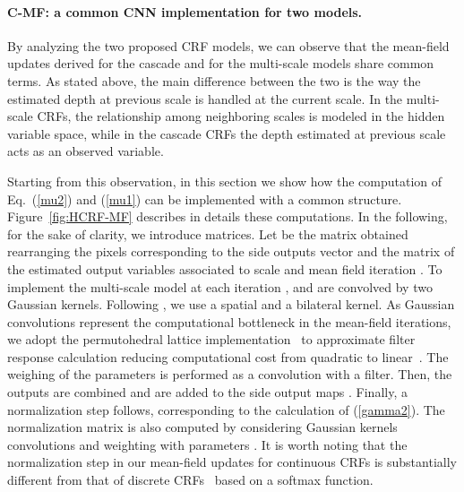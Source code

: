 \documentclass[10pt,twocolumn,letterpaper]{article}
\begin{document}
\paragraph{C-MF: a common {CNN} implementation for two models.} 
By analyzing the two proposed CRF models, we can observe that 
the mean-field updates derived for the cascade and for the multi-scale models
share common terms. As stated above, the main difference between the two is the way 
the estimated depth at previous scale is handled at the current scale. In the multi-scale CRFs, 
the relationship among neighboring scales is modeled in the hidden variable space, while in the cascade CRFs the depth estimated at previous scale acts as an observed variable.





Starting from this observation, in this section we show how the computation of Eq.~(\ref{mu2}) and (\ref{mu1}) can be implemented 
with a common structure. 
Figure~\ref{fig:HCRF-MF} describes in details these computations. In the following, for the sake of
clarity, we introduce matrices. Let  be the matrix obtained rearranging 
the  pixels corresponding to the side outputs vector  and  
the matrix of the estimated output variables associated to scale  and mean field iteration .
To implement the multi-scale model at each iteration ,  and  are convolved 
by two Gaussian kernels. Following \cite{koltun2011efficient}, we use a spatial and a bilateral kernel. As Gaussian convolutions 
represent the computational bottleneck in the mean-field iterations, 
we adopt the permutohedral lattice implementation~\cite{adams2010fast} to approximate
filter response calculation reducing computational cost from quadratic to linear~\cite{ristovski2013continuous}.
The weighing of the parameters  is performed as a convolution with a  filter.
Then, the outputs are combined and are added to the side output maps . 
Finally, a normalization step follows, corresponding to the calculation of (\ref{gamma2}). The normalization matrix 
 is also computed by considering Gaussian kernels convolutions and 
weighting with parameters . It is worth noting that the normalization step in our mean-field updates for 
continuous CRFs is substantially different from that of discrete CRFs~\cite{zheng2015conditional} based on a softmax function. 
\end{document}
